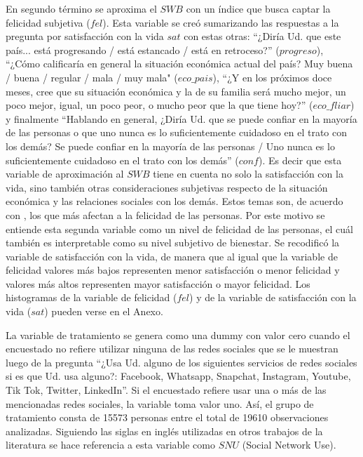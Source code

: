 \documentclass[11pt]{article}
\begin{document}
En segundo término se aproxima el $SWB$ con un índice que busca captar la felicidad subjetiva ($fel$). Esta variable se creó sumarizando las respuestas a la pregunta por satisfacción con la vida $sat$ con estas otras: ``¿Diría Ud. que este país... está progresando / está estancado / está en retroceso?'' ($progreso$), ``¿Cómo calificaría en general la situación económica actual del país? Muy buena / buena / regular / mala / muy mala" ($eco\_pais$), ``¿Y en los próximos doce meses, cree que su situación económica y la de su familia será mucho mejor, un poco mejor, igual, un poco peor, o mucho peor que la que tiene hoy?'' ($eco\_fliar$) y finalmente ``Hablando en general, ¿Diría Ud. que se puede confiar en la mayoría de las personas o que uno nunca es lo suficientemente cuidadoso en el trato con los demás? Se puede confiar en la mayoría de las personas / Uno nunca es lo suficientemente cuidadoso en el trato con los demás'' ($conf$). Es decir que esta variable de aproximación al $SWB$ tiene en cuenta no solo la satisfacción con la vida, sino también otras consideraciones subjetivas respecto de la situación económica y las relaciones sociales con los demás. Estos temas son, de acuerdo con , los que más afectan a la felicidad de las personas. Por este motivo se entiende esta segunda variable como un nivel de felicidad de las personas, el cuál también es interpretable como su nivel subjetivo de bienestar. Se recodificó la variable de satisfacción con la vida, de manera que al igual que la variable de felicidad valores más bajos representen menor satisfacción o menor felicidad y valores más altos representen mayor satisfacción o mayor felicidad. Los histogramas de la variable de felicidad ($fel$) y de la variable de satisfacción con la vida ($sat$) pueden verse en el Anexo. 

La variable de tratamiento se genera como una dummy con valor cero cuando el encuestado no refiere utilizar ninguna de las redes sociales que se le muestran luego de la pregunta ``¿Usa Ud. alguno de los siguientes servicios de redes sociales si es que Ud. usa alguno?: Facebook, Whatsapp, Snapchat, Instagram, Youtube, Tik Tok, Twitter, LinkedIn''. Si el encuestado refiere usar una o más de las mencionadas redes sociales, la variable toma valor uno. Así, el grupo de tratamiento consta de 15573 personas entre el total de 19610 observaciones analizadas. Siguiendo las siglas en inglés utilizadas en otros trabajos de la literatura se hace referencia a esta variable como $SNU$ (Social Network Use). 
\end{document}
